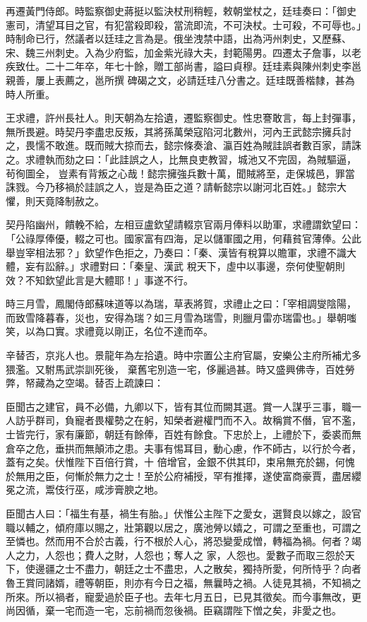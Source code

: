 \begin{pinyinscope}
 再遷黃門侍郎。時監察御史蔣挺以監決杖刑稍輕，敕朝堂杖之，廷珪奏曰：「御史憲司，清望耳目之官，有犯當殺即殺，當流即流，不可決杖。士可殺，不可辱也。」時制命已行，然議者以廷珪之言為是。俄坐洩禁中語，出為沔州刺史，又歷蘇、宋、魏三州刺史。入為少府監，加金紫光祿大夫，封範陽男。四遷太子詹事，以老疾致仕。二十二年卒，年七十餘，贈工部尚書，謚曰貞穆。廷珪素與陳州刺史李邕親善，屢上表薦之，邕所撰
 碑碣之文，必請廷珪八分書之。廷珪既善楷隸，甚為時人所重。



 王求禮，許州長社人。則天朝為左拾遺，遷監察御史。性忠謇敢言，每上封彈事，無所畏避。時契丹李盡忠反叛，其將孫萬榮寇陷河北數州，河內王武懿宗擁兵討之，畏懦不敢進。既而賊大掠而去，懿宗條奏滄、瀛百姓為賊詿誤者數百家，請誅之。求禮執而劾之曰：「此詿誤之人，比無良吏教習，城池又不完固，為賊驅逼，茍徇圖全，
 豈素有背叛之心哉！懿宗擁強兵數十萬，聞賊將至，走保城邑，罪當誅戮。今乃移禍於詿誤之人，豈是為臣之道？請斬懿宗以謝河北百姓。」懿宗大懼，則天竟降制赦之。



 契丹陷幽州，饋輓不給，左相豆盧欽望請輟京官兩月俸料以助軍，求禮謂欽望曰：「公祿厚俸優，輟之可也。國家富有四海，足以儲軍國之用，何藉貧官薄俸。公此舉豈宰相法邪？」欽望作色拒之，乃奏曰：「秦、漢皆有稅算以贍軍，求禮不識大體，妄有訟辭。」求禮對曰：「秦皇、漢武
 稅天下，虛中以事邊，奈何使聖朝則效？不知欽望此言是大體耶！」事遂不行。



 時三月雪，鳳閣侍郎蘇味道等以為瑞，草表將賀，求禮止之曰：「宰相調燮陰陽，而致雪降暮春，災也，安得為瑞？如三月雪為瑞雪，則臘月雷亦瑞雷也。」舉朝嗤笑，以為口實。求禮竟以剛正，名位不達而卒。



 辛替否，京兆人也。景龍年為左拾遺。時中宗置公主府官屬，安樂公主府所補尤多猥濫。又駙馬武崇訓死後，
 棄舊宅別造一宅，侈麗過甚。時又盛興佛寺，百姓勞弊，帑藏為之空竭。替否上疏諫曰：



 臣聞古之建官，員不必備，九卿以下，皆有其位而闕其選。賞一人謀乎三事，職一人訪乎群司，負寵者畏權勢之在躬，知榮者避權門而不入。故稱賞不僭，官不濫，士皆完行，家有廉節，朝廷有餘俸，百姓有餘食。下忠於上，上禮於下，委裘而無倉卒之危，垂拱而無顛沛之患。夫事有惕耳目，動心慮，作不師古，以行於今者，蓋有之矣。伏惟陛下百倍行賞，十
 倍增官，金銀不供其印，束帛無充於錫，何愧於無用之臣，何慚於無力之士！至於公府補授，罕有推擇，遂使富商豪賈，盡居纓冕之流，鬻伎行巫，咸涉膏腴之地。



 臣聞古人曰：「福生有基，禍生有胎。」伏惟公主陛下之愛女，選賢良以嫁之，設官職以輔之，傾府庫以賜之，壯第觀以居之，廣池膋以嬉之，可謂之至重也，可謂之至憐也。然而用不合於古義，行不根於人心，將恐變愛成憎，轉福為禍。何者？竭人之力，人怨也；費人之財，人怨也；奪人之
 家，人怨也。愛數子而取三怨於天下，使邊疆之士不盡力，朝廷之士不盡忠，人之散矣，獨持所愛，何所恃乎？向者魯王賞同諸婿，禮等朝臣，則亦有今日之福，無曩時之禍。人徒見其禍，不知禍之所來。所以禍者，寵愛過於臣子也。去年七月五日，已見其徵矣。而今事無改，更尚因循，棄一宅而造一宅，忘前禍而忽後禍。臣竊謂陛下憎之矣，非愛之也。




\end{pinyinscope}
